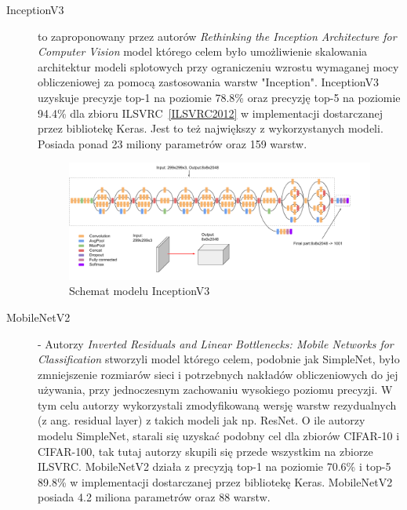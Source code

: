 \documentclass[
    left=2.5cm,         %
    right=2.5cm,        %
    top=2.5cm,          %
    bottom=3cm,         %
    bindingoffset=6mm,  %
    nohyphenation=false %
]{eiti/eiti-thesis}
\begin{document}
    \begin{description}
        \item[InceptionV3]\label{InceptionV3}
            to zaproponowany przez autorów
            \textit{Rethinking the Inception Architecture for Computer Vision}\cite{DBLP:journals/corr/SzegedyVISW15}
            model którego celem było umożliwienie skalowania architektur modeli splotowych przy ograniczeniu wzrostu
            wymaganej mocy obliczeniowej za pomocą zastosowania warstw "Inception".
            InceptionV3 uzyskuje precyzje top-1 na poziomie 78.8\% oraz precyzję top-5 na
            poziomie 94.4\% dla zbioru ILSVRC~\ref{ILSVRC2012} w implementacji dostarczanej przez bibliotekę Keras.
            Jest to też największy z wykorzystanych modeli. Posiada ponad 23 miliony parametrów oraz 159 warstw.
            \begin{figure}[H]
            \centring
            \includegraphics[width=\textwidth]{eiti/inceptionv3overview.png}
            \caption{Schemat modelu InceptionV3}
            \end{figure}
        \item[MobileNetV2]\label{MobileNetV2}
             - Autorzy \textit{Inverted Residuals and Linear Bottlenecks: Mobile Networks for Classification}\cite{DBLP:journals/corr/abs-1801-04381}
            stworzyli model którego celem, podobnie jak SimpleNet, było zmniejszenie rozmiarów sieci i potrzebnych nakładów obliczeniowych
            do jej używania, przy jednoczesnym zachowaniu wysokiego poziomu precyzji. W tym celu autorzy wykorzystali
            zmodyfikowaną wersję warstw rezydualnych (z ang. residual layer) z takich modeli jak np. ResNet\cite{DBLP:journals/corr/HeZR016}.
            O ile autorzy modelu SimpleNet, starali się uzyskać
            podobny cel dla zbiorów CIFAR-10 i CIFAR-100, tak tutaj autorzy skupili się przede wszystkim na zbiorze ILSVRC.
            MobileNetV2 działa z precyzją top-1 na poziomie 70.6\% i top-5 89.8\% w implementacji dostarczanej przez bibliotekę Keras.
            MobileNetV2 posiada 4.2 miliona parametrów oraz 88 warstw.


\end{description}
\end{document}

